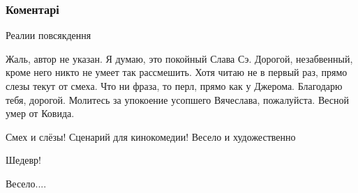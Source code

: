  
 
 
 
 
\subsubsection{Коментарі}

\begin{itemize} %
Реалии повсякдення


Жаль, автор не указан. Я думаю, это покойный Слава Сэ. Дорогой, незабвенный,
кроме него никто не умеет так рассмешить. Хотя читаю не в первый раз, прямо
слезы текут от смеха. Что ни фраза, то перл, прямо как у Джерома. Благодарю
тебя, дорогой. Молитесь за упокоение усопшего Вячеслава, пожалуйста. Весной
умер от Ковида.

Смех и слёзы! Сценарий для кинокомедии! Весело и художественно

Шедевр!

Весело....

\end{itemize} %
